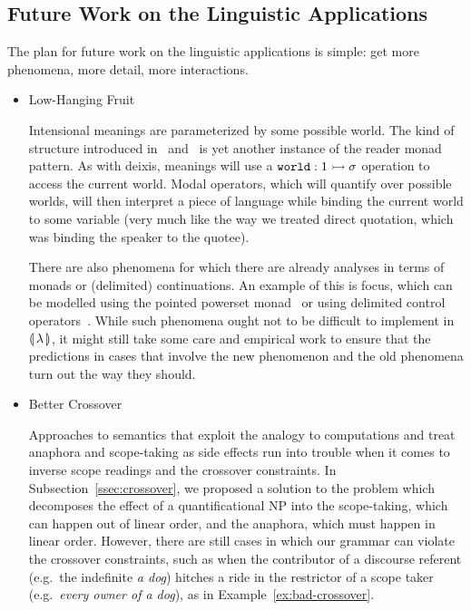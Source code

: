 \subsection{Future Work on the Linguistic Applications}
\label{ssec:future-work-linguistic}

The plan for future work on the linguistic applications is simple: get more
phenomena, more detail, more interactions.

\begin{itemize}
\item Low-Hanging Fruit

  Intensional meanings are parameterized by some possible world. The kind
  of structure introduced in~\cite{ben2007semantics} and~\cite{de2013note}
  is yet another instance of the reader monad pattern. As with deixis,
  meanings will use a $\mathtt{world} : 1 \rightarrowtail \sigma$ operation to access the
  current world. Modal operators, which will quantify over possible worlds,
  will then interpret a piece of language while binding the current world
  to some variable (very much like the way we treated direct quotation,
  which was binding the speaker to the quotee).

  There are also phenomena for which there are already analyses in terms of
  monads or (delimited) continuations. An example of this is focus, which
  can be modelled using the pointed powerset monad~\cite{shan2002monads} or
  using delimited control operators~\cite{barker2006continuations}. While
  such phenomena ought not to be difficult to implement in ${\llparenthesis \, \lambda \, \rrparenthesis}$, it
  might still take some care and empirical work to ensure that the
  predictions in cases that involve the new phenomenon and the old
  phenomena turn out the way they should.
  
  
\item Better Crossover

  Approaches to semantics that exploit the analogy to computations and
  treat anaphora and scope-taking as side effects run into trouble when it
  comes to inverse scope readings and the crossover constraints. In
  Subsection~\ref{ssec:crossover}, we proposed a solution to the problem
  which decomposes the effect of a quantificational NP into the
  scope-taking, which can happen out of linear order, and the anaphora,
  which must happen in linear order. However, there are still cases in
  which our grammar can violate the crossover constraints, such as when the
  contributor of a discourse referent (e.g.\ the indefinite \emph{a dog})
  hitches a ride in the restrictor of a scope taker (e.g.\ \emph{every
    owner of a dog}), as in Example~\ref{ex:bad-crossover}.


\end{itemize}
